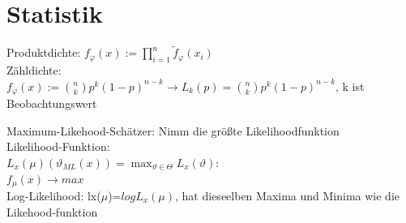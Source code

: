 \documentclass[]{article}
\begin{document}
\section{Statistik}
Produktdichte: $f_\varphi(x):=\prod_{i=1}^{n}\tilde{f}_\varphi(x_i)$\\
Zähldichte:\\
$f_\varphi(x):=$$\binom{n}{k}p^k(1-p)^{n-k}\rightarrow L_k(p)=\binom{n}{k}p^k(1-p)^{n-k}$, k ist Beobachtungswert

Maximum-Likehood-Schätzer: Nimm die größte Likelihoodfunktion \\ 
Likelihood-Funktion: \\ $L_x(\mu)(\vartheta_{ML}(x))=\max_{\vartheta \in \Theta}L_x(\vartheta)$:\\
$f_\mu(x)\rightarrow max$\\
Log-Likelihood: lx($\mu$)=$log L_x(\mu)$, hat dieseelben Maxima und Minima wie die Likehood-funktion
\end{document}
